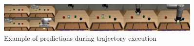 \begin{figure}[bth!]
    \centering
    \includegraphics[width=0.9\textwidth]{Figures/images/object_detector/example_prediction.png}
    \caption{Example of predictions during trajectory execution}
    \label{fig:ctdo_trajectory_execution}
\end{figure}

